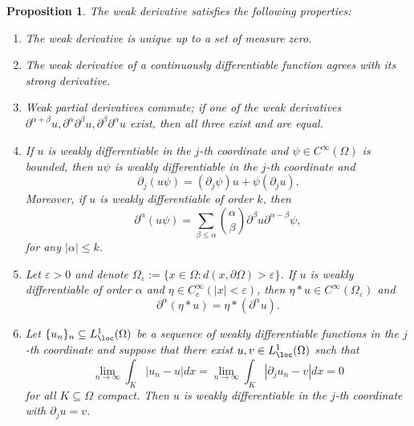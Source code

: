 \documentclass[reqno]{amsart}
\newtheorem{proposition}[theorem]{Proposition}
\theoremstyle{definition}
\theoremstyle{remark}
\renewcommand{\epsilon}{\varepsilon}
\begin{document}
\iffalse
\begin{proposition}
	The weak derivative satisfies the following properties:
\begin{enumerate}
	\item The weak derivative is unique up to a set of measure zero.
	 
	\item The weak derivative of a continuously differentiable function agrees with its strong derivative. 
	
	\item Weak partial derivatives commute; if one of the weak derivatives $\partial^{\alpha + \beta} u, \partial^\alpha \partial^\beta u, \partial^\beta \partial^\alpha u$ exist, then all three exist and are equal.
	
	\item If $u$ is weakly differentiable in the $j$-th coordinate and $\psi \in C^\infty (\Omega)$ is bounded, then $u\psi$ is weakly differentiable in the $j$-th coordinate and
				\[ \partial_j (u \psi) = (\partial_j \psi) u + \psi (\partial_j u).\] 	
			Moreover, if $u$ is weakly differentiable of order $k$, then 
				\[ \partial^\alpha (u \psi) = \sum_{\beta \leq \alpha} \binom\alpha\beta \partial^\beta u \partial^{\alpha - \beta} \psi,  \]
			for any $|\alpha| \leq k$.
			
	\item Let $\epsilon > 0$ and denote $\Omega_\epsilon := \{ x \in \Omega : d(x, \partial \Omega) > \epsilon \}$. If $u$ is weakly differentiable of order $\alpha$ and $\eta \in C^\infty_c (|x| < \epsilon)$, then $\eta * u \in C^\infty (\Omega_\epsilon)$ and
				\[ \partial^\alpha (\eta * u) = \eta * (\partial^\alpha u).  \]
	\item Let $\{ u_n \}_n \subseteq L^1_\loc (\Omega)$ be a sequence of weakly differentiable functions in the $j$-th coordinate and suppose that there exist $u, v \in L^1_\loc (\Omega)$ such that 
		\[ \lim_{n \to \infty} \int_K |u_n - u| d x = \lim_{n \to \infty} \int_K |\partial_j u_n - v| dx = 0 \]
	for all $K \subseteq \Omega$ compact. Then $u$ is weakly differentiable in the $j$-th coordinate with $\partial_j u = v$. 				
\end{enumerate}
\end{proposition}
\end{document}
